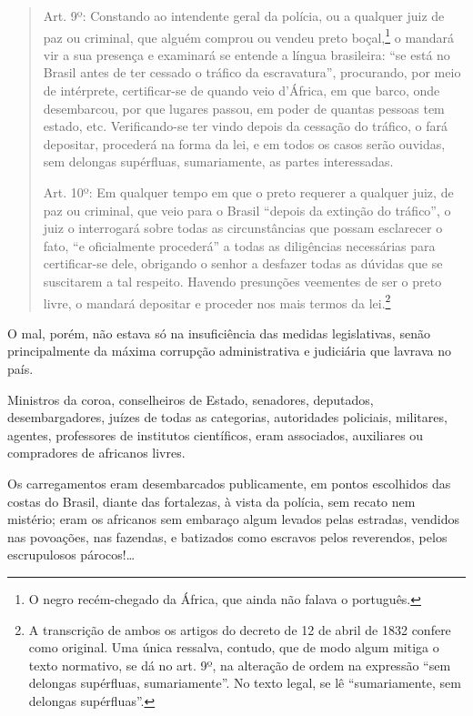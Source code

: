 \begin{quote}
Art. 9º: Constando ao intendente geral da polícia, ou a qualquer juiz
de paz ou criminal, que alguém comprou ou vendeu preto boçal,\footnote{
  O negro recém-chegado da África, que ainda não falava o português.} o
mandará vir a sua presença e examinará se entende a língua brasileira:
``se está no Brasil antes de ter cessado o tráfico da escravatura'',
procurando, por meio de intérprete, certificar-se de quando veio
d'África, em que barco, onde desembarcou, por que lugares passou, em
poder de quantas pessoas tem estado, etc. Verificando-se ter vindo
depois da cessação do tráfico, o fará depositar, procederá na forma da
lei, e em todos os casos serão ouvidas, sem delongas supérfluas,
sumariamente, as partes interessadas.

Art. 10º: Em qualquer tempo em que o preto requerer a qualquer juiz, de
paz ou criminal, que veio para o Brasil ``depois da extinção do tráfico'',
o juiz o interrogará sobre todas as circunstâncias que possam esclarecer
o fato, ``e oficialmente procederá'' a todas as diligências necessárias
para certificar-se dele, obrigando o senhor a desfazer todas as dúvidas
que se suscitarem a tal respeito. Havendo presunções veementes de ser o
preto livre, o mandará depositar e proceder nos mais termos da
lei.\footnote{A transcrição de ambos os artigos do decreto de
  12 de abril de 1832 confere como original. Uma única ressalva, contudo, que de
  modo algum mitiga o texto normativo, se dá no art. 9º, na alteração
  de ordem na expressão ``sem delongas supérfluas, sumariamente''. No
  texto legal, se lê ``sumariamente, sem delongas
  supérfluas''.}
\end{quote}  

O mal, porém, não estava só na insuficiência das medidas legislativas,
senão principalmente da máxima corrupção administrativa e judiciária que
lavrava no país.

Ministros da coroa, conselheiros de Estado, senadores, deputados,
desembargadores, juízes de todas as categorias, autoridades policiais,
militares, agentes, professores de institutos científicos, eram
associados, auxiliares ou compradores de africanos livres.

Os carregamentos eram desembarcados publicamente, em pontos escolhidos
das costas do Brasil, diante das fortalezas, à vista da polícia, sem
recato nem mistério; eram os africanos sem embaraço algum levados pelas
estradas, vendidos nas povoações, nas fazendas, e batizados como
escravos pelos reverendos, pelos escrupulosos párocos!\ldots{}

